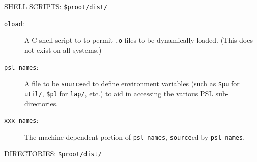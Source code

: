 \noindent
SHELL SCRIPTS: {\tt \$proot/dist/} 

\begin{description}

\item[{\tt oload}:]
A C shell script to to permit {\tt .o} files to be dynamically loaded.  (This
does not exist on all systems.)

\item[{\tt psl-names}:]
A file to be {\tt source}ed to define environment variables (such as
{\tt \$pu} for {\tt util/}, {\tt \$pl} for {\tt lap/}, etc.) to aid in
accessing the various PSL sub-directories.

\item[{\tt xxx-names}:]
The machine-dependent portion of {\tt psl-names}, {\tt source}ed by
{\tt psl-names}.

\end{description}

\noindent
DIRECTORIES: {\tt \$proot/dist/} 

